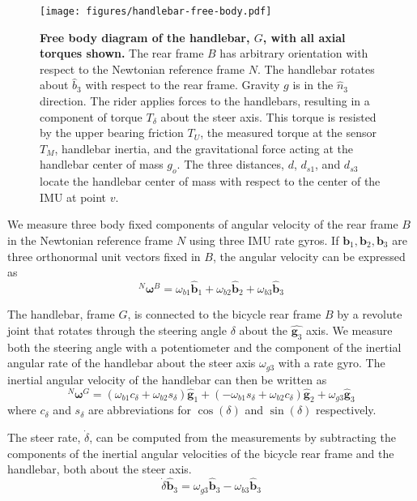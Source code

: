 \documentclass[10pt]{article}
\begin{document}
\begin{figure}
  \centering
  \texttt{[image: figures/handlebar-free-body.pdf]}
  \caption{{\bf Free body diagram of the handlebar, $G$, with all axial torques
    shown.} The rear frame $B$ has arbitrary orientation with respect to the
    Newtonian reference frame $N$. The handlebar rotates about $\hat{b}_3$ with
    respect to the rear frame. Gravity $g$ is in the $\hat{n}_3$ direction. The
    rider applies forces to the handlebars, resulting in a component of torque
    $T_\delta$ about the steer axis. This torque is resisted by the upper
    bearing friction $T_U$, the measured torque at the sensor $T_M$, handlebar
    inertia, and the gravitational force acting at the handlebar center of mass
    $g_o$. The three distances, $d$, $d_{s1}$, and $d_{s3}$ locate the
    handlebar center of mass with respect to the center of the IMU at point
    $v$.}
  \label{fig:handlebar-free-body}
\end{figure}

We measure three body fixed components of angular velocity of the rear frame
$B$ in the Newtonian reference frame $N$ using three IMU rate gyros.  If
$\mathbf{b}_{1},\mathbf{b}_{2},\mathbf{b}_{3}$ are three orthonormal unit
vectors fixed in $B$, the angular velocity can be expressed as
%
\begin{equation}
  ^N\boldsymbol{\omega}^B = \omega_{b1}\hat{\mathbf{b}}_1 +
                            \omega_{b2}\hat{\mathbf{b}}_2 +
                            \omega_{b3}\hat{\mathbf{b}}_3
  \label{eq:rear-frame-angular-rate}
\end{equation}

The handlebar, frame $G$, is connected to the bicycle rear frame $B$ by a
revolute joint that rotates through the steering angle $\delta$ about the
$\hat{\mathbf{g}_3}$ axis. We measure both the steering angle with a
potentiometer and the component of the inertial angular rate of the handlebar
about the steer axis $\omega_{g3}$ with a rate gyro. The inertial angular
velocity of the handlebar can then be written as
%
\begin{equation}
  ^N\boldsymbol{\omega}^G =
    (\omega_{b1}c_\delta + \omega_{b2}s_\delta)\hat{\mathbf{g}}_1 +
    (-\omega_{b1}s_\delta + \omega_{b2}c_\delta)\hat{\mathbf{g}}_2 +
    \omega_{g3}\hat{\mathbf{g}}_3
\end{equation}
%
where $c_\delta$ and $s_\delta$ are abbreviations for
$\operatorname{cos}(\delta)$ and $\operatorname{sin}(\delta)$ respectively.

The steer rate, $\dot{\delta}$, can be computed from the measurements by
subtracting the components of the inertial angular velocities of the bicycle
rear frame and the handlebar, both about the steer axis.
%
\begin{equation}
  \dot{\delta} \hat{\mathbf{b}}_3 = \omega_{g3} \hat{\mathbf{b}}_3 - \omega_{b3} \hat{\mathbf{b}}_3
\end{equation}
\end{document}
